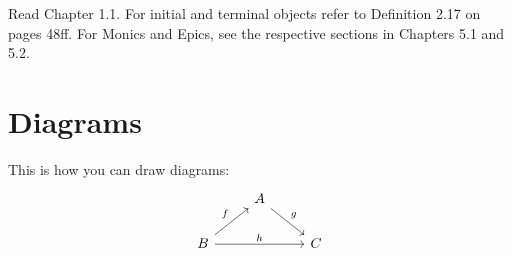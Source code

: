 \def\pathToRoot{../../}




\begin{hint}
  Read Chapter 1.1. For initial and terminal objects refer to Definition 2.17 on pages 48ff. For Monics and Epics, see the respective sections in Chapters 5.1 and 5.2.
\end{hint}

\section{Diagrams}

\begin{hint}
  This is how you can draw diagrams:
  \[
    \begin{tikzcd}
                                    & A \arrow{dr}{g}    & \\
      B \arrow{ur}{f} \arrow{rr}{h} &                    & C
    \end{tikzcd}
  \]
\end{hint}



